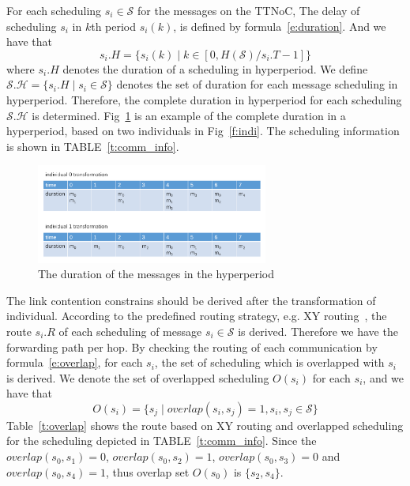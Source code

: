 \documentclass[journal]{IEEEtran}
\newcommand{\calS}{\mathcal{S}}
\newcommand{\calH}{\mathcal{H}}
\begin{document}
For each scheduling $s_i \in \calS$ for the messages on the TTNoC,
 The delay of scheduling $s_i$ in $k$th period $s_i(k)$, is defined by formula~\ref{e:duration}.
And we have that
\begin{equation}
	s_i.H = \{ s_i(k) \mid k \in [ 0, H(\calS)/s_i.T - 1 ] \}
\end{equation}
where $s_i.H$ denotes the duration of a scheduling in hyperperiod.
We define 
 $ \calS.\calH = \{ s_i.H \mid s_i \in \calS \}$
 denotes the set of duration for each message scheduling in hyperperiod. 
Therefore,
 the complete duration in hyperperiod for each scheduling $ \calS.\calH $ is determined.
Fig~\ref{f:duration} is an example of the complete duration in a hyperperiod,
 based on two individuals in Fig~\ref{f:indi}.
The scheduling information is shown in TABLE~\ref{t:comm_info}.

\begin{figure}[!t]
	\centering
	\includegraphics[width=3in]{picture/individual_transformation.pdf}
	\caption{The duration of the messages in the hyperperiod}
	\label{f:duration}
\end{figure}

The link contention constrains should be derived after the transformation of individual.
According to the predefined routing strategy,
 e.g. XY routing~\cite{DBLP:books/daglib/0087651},
  the route $s_i.R$ of each scheduling of message $s_i\in \calS$ is derived.
Therefore we have the forwarding path per hop.
By checking the routing of each communication by formula~\ref{e:overlap},
 for each $s_i$,
 the set of scheduling which is overlapped with $s_i$ is derived.
We denote the set of overlapped scheduling $O(s_i)$ for each $s_i$,
and we have that
\begin{equation}
	O(s_i) = \{ s_j \mid overlap(s_i,s_j)=1,s_i,s_j\in \calS  \}
\end{equation}
Table~\ref{t:overlap} shows the route based on XY routing and overlapped scheduling for the scheduling depicted in TABLE~\ref{t:comm_info}.
Since the $overlap(s_{0},s_{1})=0$, $overlap(s_{0},s_{2})=1$, $overlap(s_{0},s_{3})=0$ and $overlap(s_{0},s_{4})=1$, thus overlap set $O(s_{0})$ is $\{ s_{2},s_{4} \}$. 
\end{document}
